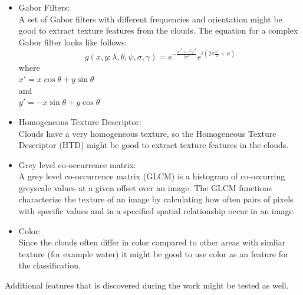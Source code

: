 \documentclass{article}
\begin{document}
\begin{itemize}
\item Gabor Filters: \\
A set of Gabor filters with different frequencies and orientation might be good to extract  texture features from the clouds.
The equation for a complex Gabor filter looks like follows:
\begin{equation}
g(x, y; \lambda, \theta, \psi, \sigma, \gamma) = e^{-\frac{x'^2 + \gamma^2y'^2}{2\sigma^2}}e^{i(2\pi\frac{x'}{\lambda} + \psi)}
\end{equation}
where \\
$x' = x\cos\theta + y\sin\theta$ \\
and \\
$y' = -x\sin\theta + y\cos\theta$

\item Homogeneous Texture Descriptor: \\
Clouds have a very homogeneous texture, so the Homogeneous Texture Descriptor (HTD) might be good to extract texture features in the clouds. 

\item Grey level co-occurrence matrix: \\
A grey level co-occurrence matrix (GLCM) is a histogram of co-occurring greyscale values at a given offset over an image. The GLCM functions characterize the texture of an image by calculating how often pairs of pixels with specific values and in a specified spatial relationship occur in an image.

\item Color: \\
Since the clouds often differ in color compared to other areas with simliar texture (for example water) it might be good to use color as an feature for the classification. 
\end{itemize}
Additional features that is discovered during the work might be tested as well.



\end{document}

